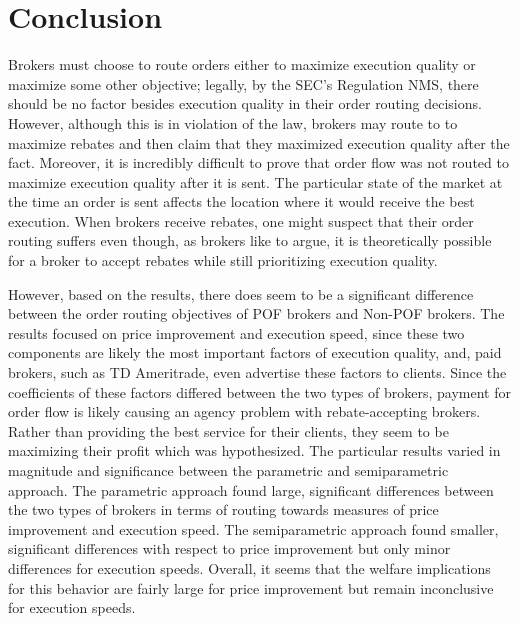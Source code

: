 \documentclass[12pt,a4paper]{article}
\begin{document}
\section{Conclusion}



Brokers must choose to route orders either to maximize execution quality or maximize
some other objective; legally, by the SEC’s Regulation NMS, there should be no factor
besides execution quality in their order routing decisions. However, although this is in
violation of the law, brokers may route to to maximize rebates and then claim that
they maximized execution quality after the fact. Moreover, it is incredibly difficult to
prove that order flow was not routed to maximize execution quality after it is sent. The
particular state of the market at the time an order is sent affects the location where it
would receive the best execution. When brokers receive rebates, one might suspect that
their order routing suffers even though, as brokers like to argue, it is theoretically possible for a broker to accept
rebates while still prioritizing execution quality.

However, based on the results, there does seem to be a significant difference between
the order routing objectives of POF brokers and Non-POF brokers. 
The results focused on price improvement and execution speed, since these two components are likely the most important factors of execution quality, and, paid brokers, such as TD Ameritrade, even advertise these factors to clients. 
Since the coefficients of these factors differed between the two types of brokers, payment for order flow is likely causing an agency problem with rebate-accepting brokers. Rather than providing the best service for their clients, they seem to be maximizing their profit which was hypothesized. 
The particular results varied in magnitude and significance between the parametric and semiparametric approach. The parametric approach found large, significant differences between the two types of brokers in terms of routing towards measures of price improvement and execution speed. The semiparametric approach found smaller, significant differences with respect to price improvement but only minor differences for execution speeds. Overall, it seems that the welfare implications for this behavior are fairly large for price improvement but remain inconclusive for execution speeds. 
\end{document}
